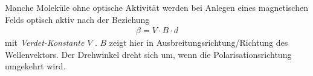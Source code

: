 Manche Moleküle ohne optische Aktivität werden bei Anlegen eines
magnetischen Felds optisch aktiv nach der Beziehung
\begin{gather*}
  \beta = V\cdot B\cdot d
\end{gather*}
mit
\emph{Verdet-Konstante} $V$%
%
.
$B$ zeigt hier in Ausbreitungsrichtung/Richtung des Wellenvektors.
Der Drehwinkel dreht sich um, wenn die Polarisationsrichtung umgekehrt
wird.


